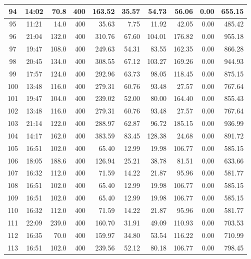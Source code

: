 \begin{landscape}
\begin{longtable}{|c|c|r|r|r|r|r|r|r|r|}
\hline
94 & 14:02 & 70.8 & 400 & 163.52 & 35.57 & 54.73 & 56.06 & 0.00 & 655.15 \\
\hline
\rowcolor{gray!8}
95 & 11:21 & 14.0 & 400 & 35.63 & 7.75 & 11.92 & 42.05 & 0.00 & 485.42 \\
\hline
96 & 21:04 & 132.0 & 400 & 310.76 & 67.60 & 104.01 & 176.82 & 0.00 & 955.18 \\
\hline
\rowcolor{gray!8}
97 & 19:47 & 108.0 & 400 & 249.63 & 54.31 & 83.55 & 162.35 & 0.00 & 866.28 \\
\hline
98 & 20:45 & 134.0 & 400 & 308.55 & 67.12 & 103.27 & 169.26 & 0.00 & 944.93 \\
\hline
\rowcolor{gray!8}
99 & 17:57 & 124.0 & 400 & 292.96 & 63.73 & 98.05 & 118.45 & 0.00 & 875.15 \\
\hline
100 & 13:48 & 116.0 & 400 & 279.31 & 60.76 & 93.48 & 27.57 & 0.00 & 767.64 \\
\hline
\rowcolor{gray!8}
101 & 19:47 & 104.0 & 400 & 239.02 & 52.00 & 80.00 & 164.40 & 0.00 & 855.43 \\
\hline
102 & 13:48 & 116.0 & 400 & 279.31 & 60.76 & 93.48 & 27.57 & 0.00 & 767.64 \\
\hline
\rowcolor{gray!8}
103 & 21:14 & 122.0 & 400 & 288.97 & 62.87 & 96.72 & 185.15 & 0.00 & 936.99 \\
\hline
104 & 14:17 & 162.0 & 400 & 383.59 & 83.45 & 128.38 & 24.68 & 0.00 & 891.72 \\
\hline
\rowcolor{gray!8}
105 & 16:51 & 102.0 & 400 & 65.40 & 12.99 & 19.98 & 106.77 & 0.00 & 585.15 \\
\hline
106 & 18:05 & 188.6 & 400 & 126.94 & 25.21 & 38.78 & 81.51 & 0.00 & 633.66 \\
\hline
\rowcolor{gray!8}
107 & 16:32 & 112.0 & 400 & 71.59 & 14.22 & 21.87 & 95.96 & 0.00 & 581.77 \\
\hline
108 & 16:51 & 102.0 & 400 & 65.40 & 12.99 & 19.98 & 106.77 & 0.00 & 585.15 \\
\hline
\rowcolor{gray!8}
109 & 16:51 & 102.0 & 400 & 65.40 & 12.99 & 19.98 & 106.77 & 0.00 & 585.15 \\
\hline
110 & 16:32 & 112.0 & 400 & 71.59 & 14.22 & 21.87 & 95.96 & 0.00 & 581.77 \\
\hline
\rowcolor{gray!8}
111 & 22:09 & 239.0 & 400 & 160.70 & 31.91 & 49.09 & 110.93 & 0.00 & 703.53 \\
\hline
112 & 16:35 & 70.0 & 400 & 159.97 & 34.80 & 53.54 & 116.22 & 0.00 & 710.99 \\
\hline
\rowcolor{gray!8}
113 & 16:51 & 102.0 & 400 & 239.56 & 52.12 & 80.18 & 106.77 & 0.00 & 798.45 \\

\end{longtable}
\end{landscape}

